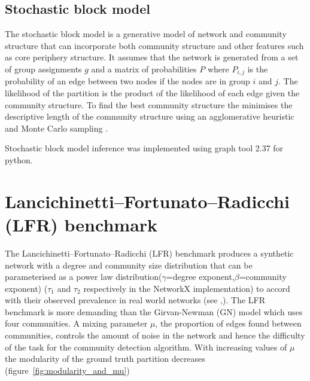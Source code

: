 \subsection{Stochastic block model}
\label{sec:stochastic block model}
The stochastic block model is a generative model of network and community structure that can incorporate both community structure and other features such as core periphery structure. It assumes that the network is generated from a set of group assignments $g$ and a matrix of probabilities $P$ where $P_{i,j}$ is the probability of an edge between two nodes if the nodes are in group $i$ and $j$. The likelihood of the partition is the product of the likelihood of each edge given the community structure. To find the best community structure the minimises the descriptive length of the community structure using an agglomerative heuristic and Monte Carlo sampling \cite{peixoto2014efficient}.

Stochastic block model inference was implemented using graph tool 2.37 for python\cite{peixoto_graph-tool_2014}. 






 \section{Lancichinetti–Fortunato–Radicchi (LFR) benchmark}
\label{sec:LFR benchmark}


The Lancichinetti–Fortunato–Radicchi (LFR) benchmark\cite{lancichinetti2008benchmark} produces a synthetic network with  a degree  and community size distribution that can be parameterised as a power law distribution($\gamma$=degree exponent,$\beta$=community exponent)\cite{lancichinetti2009community} ($\tau_1$ and $\tau_2$ respectively in the NetworkX implementation\cite{hagberg2008exploring}) to accord with  their observed prevalence in real world networks (see \cite{radicchi2004defining},\cite{palla2005uncovering}). The LFR benchmark is more demanding than the Girvan-Newman (GN) model which uses four communities\cite{girvan2002community}. A mixing parameter $\mu$, the proportion of edges found between communities, controls the amount of noise in the network and hence the difficulty of the task for the community detection algorithm. With increasing values of $\mu$ the modularity of the ground truth partition decreases (figure~\ref{fig:modularity_and_mu})




